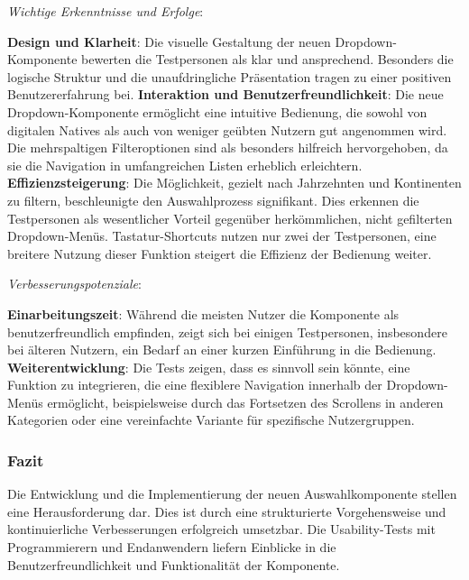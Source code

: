 \emph{Wichtige Erkenntnisse und Erfolge}:

\textbf{Design und Klarheit}:
Die visuelle Gestaltung der neuen Dropdown-Komponente bewerten die Testpersonen als klar und ansprechend. Besonders die logische Struktur und die unaufdringliche Präsentation tragen zu einer positiven Benutzererfahrung bei.
\textbf{Interaktion und Benutzerfreundlichkeit}:
Die neue Dropdown-Komponente ermöglicht eine intuitive Bedienung, die sowohl von digitalen Natives als auch von weniger geübten Nutzern gut angenommen wird. Die mehrspaltigen Filteroptionen sind als besonders hilfreich hervorgehoben, da sie die Navigation in umfangreichen Listen erheblich erleichtern.
\textbf{Effizienzsteigerung}:
Die Möglichkeit, gezielt nach Jahrzehnten und Kontinenten zu filtern, beschleunigte den Auswahlprozess signifikant. Dies erkennen die Testpersonen als wesentlicher Vorteil gegenüber herkömmlichen, nicht gefilterten Dropdown-Menüs. Tastatur-Shortcuts nutzen nur zwei der Testpersonen, eine breitere Nutzung dieser Funktion steigert die Effizienz der Bedienung weiter.

\emph{Verbesserungspotenziale}:

\textbf{Einarbeitungszeit}:
Während die meisten Nutzer die Komponente als benutzerfreundlich empfinden, zeigt sich bei einigen Testpersonen, insbesondere bei älteren Nutzern, ein Bedarf an einer kurzen Einführung in die Bedienung.
\textbf{Weiterentwicklung}:
Die Tests zeigen, dass es sinnvoll sein könnte, eine Funktion zu integrieren, die eine flexiblere Navigation innerhalb der Dropdown-Menüs ermöglicht, beispielsweise durch das Fortsetzen des Scrollens in anderen Kategorien oder eine vereinfachte Variante für spezifische Nutzergruppen.


\subsubsection{\color{dblue} Fazit}
\label{sec:userTestsSummery}

Die Entwicklung und die Implementierung der neuen Auswahlkomponente stellen eine Herausforderung dar. 
Dies ist durch eine strukturierte Vorgehensweise und kontinuierliche Verbesserungen erfolgreich umsetzbar. 
Die Usability-Tests mit Programmierern und Endanwendern liefern Einblicke in die Benutzerfreundlichkeit und Funktionalität der Komponente. 


